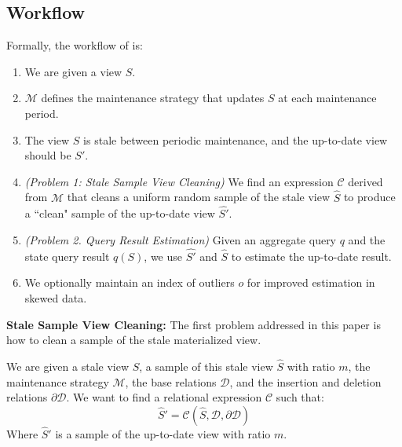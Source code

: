 
\subsection{\svc Workflow}
Formally, the workflow of \svc is:
\begin{enumerate}[noitemsep]
\item We are given a view $S$.
\item $\mathcal{M}$ defines the maintenance strategy that updates $S$ at each maintenance period.
\item The view $S$ is stale between periodic maintenance, and the up-to-date view should be $S'$.
\item \emph{(Problem 1: Stale Sample View Cleaning)} We find an expression $\mathcal{C}$ derived from $\mathcal{M}$ 
that cleans a uniform random sample of the stale view $\widehat{S}$ to produce a ``clean" sample of the up-to-date
view $\widehat{S'}$.
\item \emph{(Problem 2. Query Result Estimation)} Given an aggregate query $q$ and the state query result $q(S)$, we use $\widehat{S'}$ and $\widehat{S}$ to estimate the up-to-date result.
\item We optionally maintain an index of outliers $o$ for improved estimation in skewed data.
\end{enumerate} 

\noindent\textbf{Stale Sample View Cleaning: }
The first problem addressed in this paper is how to clean a sample of the stale materialized view.
\begin{problem}
We are given a stale view $S$, a sample of this stale view $\widehat{S}$ with ratio $m$, the maintenance strategy $\mathcal{M}$, the base relations $\mathcal{D}$, and
the insertion and deletion relations $\partial \mathcal{D}$.
We want to find a relational expression $\mathcal{C}$ such that:
\[
\widehat{S}' = \mathcal{C}(\widehat{S},\mathcal{D},\partial \mathcal{D})
\]
Where $\widehat{S}'$ is a sample of the up-to-date view with ratio $m$. 
\end{problem}

